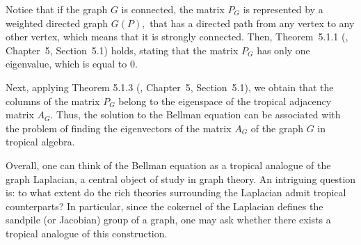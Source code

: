 \documentclass[reqno,11pt]{amsart}
\begin{document}
Notice that if the graph $G$ is connected, the matrix $P_{G}$ is represented by a weighted directed graph $G(P),$ that has a directed path from any vertex to any other vertex, which means that it is strongly connected. Then, Theorem~5.1.1 (\cite{MacSturm}, Chapter~5, Section~5.1) holds, stating that the matrix $P_{G}$ has only one eigenvalue, which is equal to 0.

Next, applying Theorem 5.1.3 (\cite{MacSturm}, Chapter~5, Section~5.1), we obtain that the columns of the matrix $P_{G}$ belong to the eigenspace of the tropical adjacency matrix $A_{G}.$ Thus, the solution to the Bellman equation can be associated with the problem of finding the eigenvectors of the matrix $A_{G}$ of the graph $G$ in tropical algebra.

Overall, one can think of the Bellman equation as a tropical analogue of the graph Laplacian, a central object of study in graph theory.
An intriguing question is: to what extent do the rich theories surrounding the Laplacian admit tropical counterparts?
In particular, since the cokernel of the Laplacian defines the sandpile (or Jacobian) group of a graph, one may ask whether there exists a tropical analogue of this construction.
\end{document}
